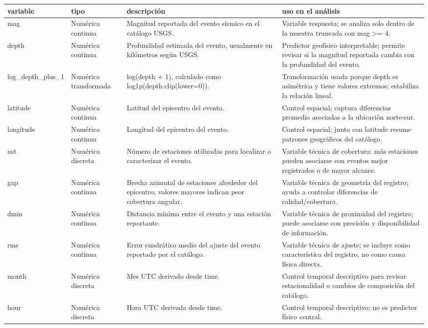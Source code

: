 \begin{tabular}{llll}
\toprule
variable & tipo & descripción & uso en el análisis \\
\midrule
mag & Numérica continua & Magnitud reportada del evento sísmico en el catálogo USGS. & Variable respuesta; se analiza solo dentro de la muestra truncada con mag >= 4. \\
depth & Numérica continua & Profundidad estimada del evento, usualmente en kilómetros según USGS. & Predictor geofísico interpretable; permite revisar si la magnitud reportada cambia con la profundidad del evento. \\
log\_depth\_plus\_1 & Numérica transformada & log(depth + 1), calculado como log1p(depth.clip(lower=0)). & Transformación usada porque depth es asimétrica y tiene valores extremos; estabiliza la relación lineal. \\
latitude & Numérica continua & Latitud del epicentro del evento. & Control espacial; captura diferencias promedio asociadas a la ubicación norte-sur. \\
longitude & Numérica continua & Longitud del epicentro del evento. & Control espacial; junto con latitude resume patrones geográficos del catálogo. \\
nst & Numérica discreta & Número de estaciones utilizadas para localizar o caracterizar el evento. & Variable técnica de cobertura: más estaciones pueden asociarse con eventos mejor registrados o de mayor alcance. \\
gap & Numérica continua & Brecha azimutal de estaciones alrededor del epicentro; valores mayores indican peor cobertura angular. & Variable técnica de geometría del registro; ayuda a controlar diferencias de calidad/cobertura. \\
dmin & Numérica continua & Distancia mínima entre el evento y una estación reportante. & Variable técnica de proximidad del registro; puede asociarse con precisión y disponibilidad de información. \\
rms & Numérica continua & Error cuadrático medio del ajuste del evento reportado por el catálogo. & Variable técnica de ajuste; se incluye como característica del registro, no como causa física directa. \\
month & Numérica discreta & Mes UTC derivado desde time. & Control temporal descriptivo para revisar estacionalidad o cambios de composición del catálogo. \\
hour & Numérica discreta & Hora UTC derivada desde time. & Control temporal descriptivo; no es predictor físico central. \\

\end{tabular}

